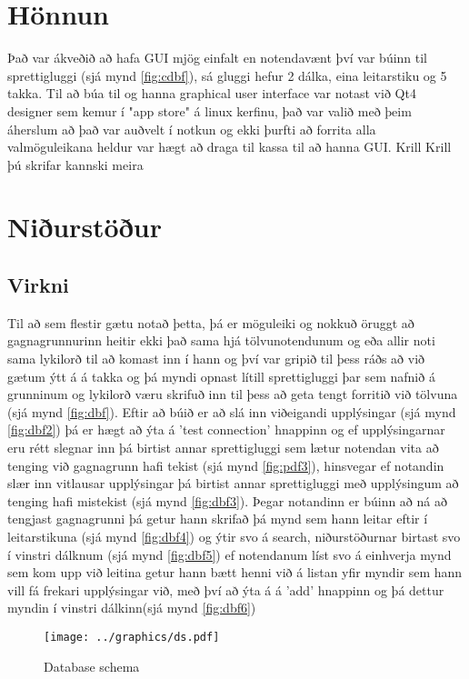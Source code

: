 \documentclass[12pt, git, final]{rureport}
\begin{document}
\section{Hönnun}
Það var ákveðið að hafa GUI mjög einfalt en notendavænt því var búinn til sprettigluggi (sjá mynd \ref{fig:cdbf}), sá gluggi hefur 2 dálka, eina leitarstiku og 5 takka. Til að búa til og hanna graphical user interface var notast við Qt4 designer sem kemur í "app store" á linux kerfinu, það var valið með þeim áherslum að það var auðvelt í notkun og ekki þurfti að forrita alla valmöguleikana heldur var hægt að draga til kassa til að hanna GUI. Krill Krill þú skrifar kannski meira 

\section{Niðurstöður}\label{nidurstodur}
\subsection {Virkni}
Til að sem flestir gætu notað þetta, þá er möguleiki og nokkuð öruggt að gagnagrunnurinn heitir ekki það sama hjá tölvunotendunum og eða allir noti sama lykilorð til að komast inn í hann og því var gripið til þess ráðs að við gætum ýtt á á takka og þá myndi opnast lítill sprettigluggi þar sem nafnið á grunninum og lykilorð væru skrifuð inn til þess að geta tengt forritið við tölvuna (sjá mynd \ref{fig:dbf}).
Eftir að búið er að slá inn viðeigandi upplýsingar (sjá mynd \ref{fig:dbf2}) þá er hægt að ýta á 'test connection' hnappinn og ef upplýsingarnar eru rétt slegnar inn þá birtist annar sprettigluggi sem lætur notendan vita að tenging við gagnagrunn hafi tekist (sjá mynd \ref{fig:pdf3}), hinsvegar ef notandin slær inn vitlausar upplýsingar þá birtist annar sprettigluggi með upplýsingum að tenging hafi mistekist (sjá mynd \ref {fig:dbf3}).
\newline
\newline
Þegar notandinn er búinn að ná að tengjast gagnagrunni þá getur hann skrifað þá mynd sem hann leitar eftir í leitarstikuna (sjá mynd \ref{fig:dbf4}) og ýtir svo á search, niðurstöðurnar birtast svo í vinstri dálknum (sjá mynd \ref{fig:dbf5}) ef notendanum líst svo á einhverja mynd sem kom upp við leitina  getur hann bætt henni við á listan yfir myndir sem hann vill fá frekari upplýsingar við, með því að ýta á á 'add' hnappinn og þá dettur myndin í vinstri dálkinn(sjá mynd \ref{fig:dbf6})

\pagebreak
\begin{figure}
	\centering 
	\texttt{[image: ../graphics/ds.pdf]}
	\caption{Database schema \label{fig:dataschema}}
\end{figure}
\end{document}
